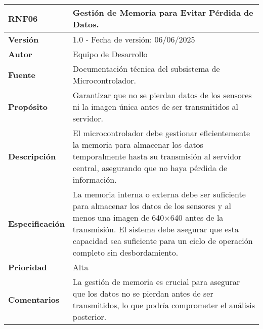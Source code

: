 \begin{longtable}{|l|p{12cm}|}
\hline
\textbf{RNF06} & \textbf{Gestión de Memoria para Evitar Pérdida de Datos.} \\
\hline
\endfirsthead
\hline
\textbf{Versión} & 1.0 - Fecha de versión: 06/06/2025 \\
\hline
\textbf{Autor} & Equipo de Desarrollo \\
\hline
\textbf{Fuente} & Documentación técnica del subsistema de Microcontrolador. \\
\hline
\textbf{Propósito} & Garantizar que no se pierdan datos de los sensores ni la imagen única antes de ser transmitidos al servidor. \\
\hline
\textbf{Descripción} & El microcontrolador debe gestionar eficientemente la memoria para almacenar los datos temporalmente hasta su transmisión al servidor central, asegurando que no haya pérdida de información. \\
\hline
\textbf{Especificación} & La memoria interna o externa debe ser suficiente para almacenar los datos de los sensores y al menos una imagen de 640×640 antes de la transmisión. El sistema debe asegurar que esta capacidad sea suficiente para un ciclo de operación completo sin desbordamiento. \\
\hline
\textbf{Prioridad} & Alta \\
\hline
\textbf{Comentarios} & La gestión de memoria es crucial para asegurar que los datos no se pierdan antes de ser transmitidos, lo que podría comprometer el análisis posterior. \\
\hline
\end{longtable}


